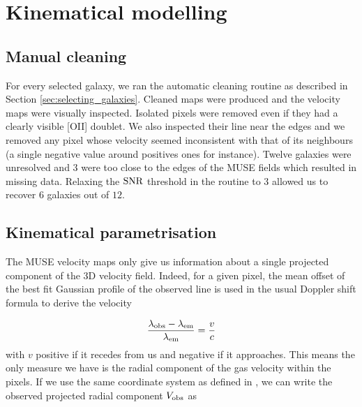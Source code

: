 \clearpage
\section{Kinematical modelling}
\label{sec:kinematical_modelling}

\subsection{Manual cleaning}

For every selected galaxy, we ran the automatic cleaning routine as described in Section \ref{sec:selecting_galaxies}. Cleaned maps were produced and the velocity maps were visually inspected. Isolated pixels were removed even if they had a clearly visible [OII] doublet. We also inspected their line near the edges and we removed any pixel whose velocity seemed inconsistent with that of its neighbours (a single negative value around positives ones for instance). Twelve galaxies were unresolved and $3$ were too close to the edges of the MUSE fields which resulted in missing data. Relaxing the $\rm{SNR}$ threshold in the routine to $3$ allowed us to recover $6$ galaxies out of $12$. 

\subsection{Kinematical parametrisation}

The MUSE velocity maps only give us information about a single projected component of the 3D velocity field. Indeed, for a given pixel, the mean offset of the best fit Gaussian profile of the observed line is used in the usual Doppler shift formula to derive the velocity

\begin{equation}
	\frac{\lambda_{\rm{obs}} - \lambda_{\rm{em}}}{\lambda_{\rm{em}}} = \frac{v}{c}
\end{equation}
with $v$ positive if it recedes from us and negative if it approaches. This means the only measure we have is the radial component of the gas velocity within the pixels. If we use the same coordinate system as defined in , we can write the observed projected radial component $V_{\rm{obs}}$ as 

